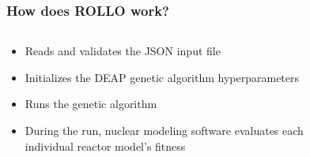 \begin{frame}
    \frametitle{How does ROLLO work?}
    \begin{columns}
        \begin{column}{0.7\textwidth}
            \begin{itemize}
                \item Reads and validates the JSON input file
                \item Initializes the \acrfull{DEAP} genetic algorithm hyperparameters
                \item Runs the genetic algorithm  
                \item During the run, nuclear modeling software evaluates each individual 
                reactor model's fitness
            \end{itemize}
        \end{column}
        \begin{column}{0.3\textwidth}
            \begin{figure}

\end{figure}
\end{column}
\end{columns}
\end{frame}
